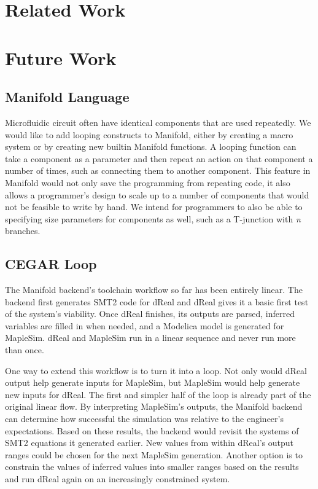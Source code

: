 \section{Related Work}



\section{Future Work}

\subsection{Manifold Language}

Microfluidic circuit often have identical components that are used repeatedly.
We would like to add looping constructs to Manifold, either by creating a
macro system or by creating new builtin Manifold functions. A looping function
can take a component as a parameter and then repeat an action on that
component a number of times, such as connecting them to another component.
This feature in Manifold would not only save the programming from repeating
code, it also allows a programmer's design to scale up to a number of
components that would not be feasible to write by hand. We intend for
programmers to also be able to specifying size parameters for components as
well, such as a T-junction with \emph{n} branches.

\subsection{CEGAR Loop}

The Manifold backend's toolchain workflow so far has been entirely linear.
The backend first generates SMT2 code for dReal and dReal gives it a basic first test of the system's viability.
Once dReal finishes, its outputs are parsed, inferred variables are filled in when needed, and a Modelica model is generated for MapleSim.
dReal and MapleSim run in a linear sequence and never run more than once.

One way to extend this workflow is to turn it into a loop.
Not only would dReal output help generate inputs for MapleSim, but MapleSim would help generate new inputs for dReal.
The first and simpler half of the loop is already part of the original linear flow.
By interpreting MapleSim's outputs, the Manifold backend can determine how successful the simulation was relative to the engineer's expectations.
Based on these results, the backend would revisit the systems of SMT2 equations it generated earlier.
New values from within dReal's output ranges could be chosen for the next MapleSim generation.
Another option is to constrain the values of inferred values into smaller ranges based on the results and run dReal again on an increasingly constrained system.

